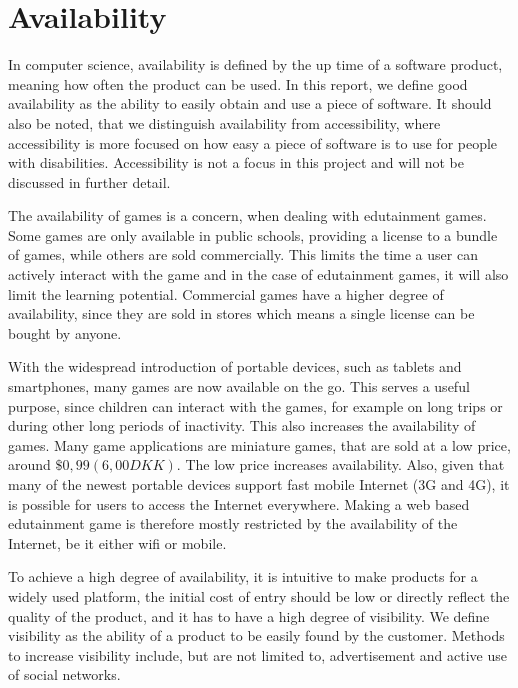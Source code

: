 \section{Availability}
\label{sec:availability}
In computer science, availability is defined by the up time of a software product, meaning how often the product can be used.\cite{defAvailability}
In this report, we define good availability as the ability to easily obtain and use a piece of software.
It should also be noted, that we distinguish availability from accessibility, where accessibility is more focused on how easy a piece of software is to use for people with disabilities.
Accessibility is not a focus in this project and will not be discussed in further detail.\newline

The availability of games is a concern, when dealing with edutainment games.
Some games are only available in public schools, providing a license to a bundle of games, while others are sold commercially.
This limits the time a user can actively interact with the game and in the case of edutainment games, it will also limit the learning potential.
Commercial games have a higher degree of availability, since they are sold in stores which means a single license can be bought by anyone.\newline

With the widespread introduction of portable devices, such as tablets and smartphones, many games are now available on the go.
This serves a useful purpose, since children can interact with the games, for example on long trips or during other long periods of inactivity.
This also increases the availability of games.
Many game applications are miniature games, that are sold at a low price, around $\$0,99 (6,00 DKK)$.
The low price increases availability.
Also, given that many of the newest portable devices support fast mobile Internet (3G and 4G), it is possible for users to access the Internet everywhere.
Making a web based edutainment game is therefore mostly restricted by the availability of the Internet, be it either wifi or mobile.\newline

To achieve a high degree of availability, it is intuitive to make products for a widely used platform, the initial cost of entry should be low or directly reflect the quality of the product, and it has to have a high degree of visibility.
We define visibility as the ability of a product to be easily found by the customer.
Methods to increase visibility include, but are not limited to, advertisement and active use of social networks.